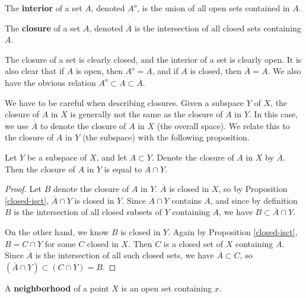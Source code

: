 \documentclass[10pt]{report}
\begin{document}
\begin{defn}
	The \textbf{interior} of a set $A$, denoted $A^o$, is the union of all open sets contained in $A$.

	The \textbf{closure} of a set $A$, denoted $\overline{A}$ is the intersection of all closed sets containing $A$.
\end{defn}

The closure of a set is clearly closed, and the interior of a set is clearly open. It is also clear that if $A$ is open, then $A^o = A$, and if $A$ is closed, then $\overline{A}=A$. We also have the obvious relation $A^o \subset A \subset \overline{A}$.

We have to be careful when describing closures. Given a subspace $Y$ of $X$, the closure of $A$ in $X$ is generally not the same as the closure of $A$ in $Y$. In this case, we use $\overline{A}$ to denote the closure of $A$ in $X$ (the overall space). We relate this to the closure of $A$ in $Y$ (the subspace) with the following proposition.

\begin{prop}
	Let $Y$ be a subspace of $X$, and let $A \subset Y$. Denote the closure of $A$ in $X$ by $\overline{A}$. Then the closure of $A$ in $Y$ is equal to $\overline{A} \cap Y$.
\end{prop}
\begin{proof}
	Let $B$ denote the closure of $A$ in $Y$. $\overline{A}$ is closed in $X$, so by Proposition \ref{closed-isct}, $\overline{A} \cap Y$ is closed in $Y$. Since $\overline{A} \cap Y$ contains $A$, and since by definition $B$ is the intersection of all closed subsets of $Y$ containing $A$, we have $B \subset \overline{A}\cap Y$.

	On the other hand, we know $B$ is closed in $Y$. Again by Proposition \ref{closed-isct}, $B = C \cap Y$ for some $C$ closed in $X$. Then $C$ is a closed set of $X$ containing $A$. Since $\overline{A}$ is the intersection of all such closed sets, we have $\overline{A} \subset C$, so $(\overline{A} \cap Y) \subset (C \cap Y) = B$.
\end{proof}

\begin{defn}
A \textbf{neighborhood} of a point $X$ is an open set containing $x$.
\end{defn}
\end{document}
